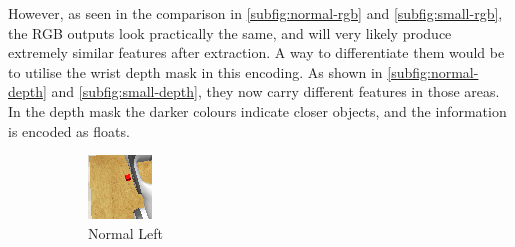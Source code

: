 However, as seen in the comparison in \ref{subfig:normal-rgb} and \ref{subfig:small-rgb}, the RGB outputs look practically the same, and will very likely produce extremely similar features after extraction. A way to differentiate them would be to utilise the wrist depth mask in this encoding. As shown in \ref{subfig:normal-depth} and \ref{subfig:small-depth}, they now carry different features in those areas. In the depth mask the darker colours indicate closer objects, and the information is encoded as floats. 

\begin{figure}[htpb] %
  \centering
  \begin{subfigure}{0.2\linewidth}
    \centering
    \includegraphics[width=\linewidth]{assets/depth-interfacing/normal-l_rgb.png}
    \caption{Normal Left}\label{subfig:normal-l-shoulder}
  \end{subfigure}
  \begin{subfigure}{0.2\linewidth}
    \centering

\end{subfigure}
\end{figure}
